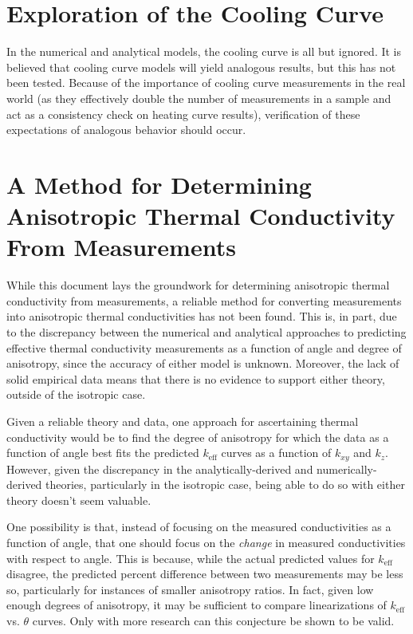 \section{Exploration of the Cooling Curve}

In the numerical and analytical models, the cooling curve is all but ignored. It
is believed that cooling curve models will yield analogous results, but this has
not been tested. Because of the importance of cooling curve measurements in the
real world (as they effectively double the number of measurements in a sample
and act as a consistency check on heating curve results),
verification of these expectations of analogous behavior should occur.

\section{A Method for Determining Anisotropic Thermal Conductivity From Measurements}

While this document lays the groundwork for determining anisotropic thermal
conductivity from measurements, a reliable method for converting measurements
into anisotropic thermal conductivities has not been found. This is, in part,
due to the discrepancy between the numerical and analytical approaches to
predicting effective thermal conductivity measurements as a function of angle
and degree of anisotropy, since the accuracy of either model is unknown.
Moreover, the lack of solid empirical data means that there is no evidence to
support either theory, outside of the isotropic case.

Given a reliable theory and data, one approach for ascertaining thermal
conductivity would be to find the degree of anisotropy for which the data as a
function of angle best fits the predicted \(k_{\textrm{eff}}\) curves
as a function of \(k_{xy}\) and \(k_z\). However, given the discrepancy in the
analytically-derived and numerically-derived theories, particularly in the
isotropic case, being able to do so with either theory doesn't seem valuable.

One possibility is that, instead of focusing on the measured conductivities as a
function of angle, that one should focus on the \emph{change} in measured
conductivities with respect to angle. This is because, while the actual predicted
values for \(k_{\textrm{eff}}\) disagree, the predicted percent difference
between two measurements may be less so, particularly for instances of smaller
anisotropy ratios. In fact, given low enough degrees of
anisotropy, it may be sufficient to compare linearizations of
\(k_{\textrm{eff}}\) vs. \(\theta\) curves. Only with more research can this
conjecture be shown to be valid.

